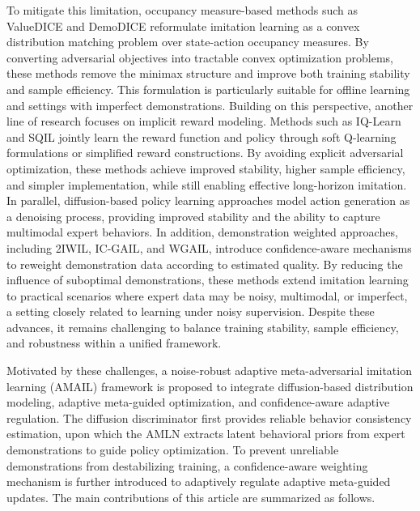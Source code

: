 \documentclass[journal]{IEEEtran}
\begin{document}
To mitigate this limitation, occupancy measure-based methods such as ValueDICE\cite{kostrikov2019imitation} and DemoDICE\cite{kim2021demodice} reformulate imitation learning as a convex distribution matching problem over state-action occupancy measures. By converting adversarial objectives into tractable convex optimization problems, these methods remove the minimax structure and improve both training stability and sample efficiency. This formulation is particularly suitable for offline learning and settings with imperfect demonstrations. Building on this perspective, another line of research focuses on implicit reward modeling. Methods such as IQ-Learn\cite{garg2021iq} and SQIL\cite{reddy2019sqil} jointly learn the reward function and policy through soft Q-learning formulations or simplified reward constructions. By avoiding explicit adversarial optimization, these methods achieve improved stability, higher sample efficiency, and simpler implementation, while still enabling effective long-horizon imitation. In parallel, diffusion-based policy learning approaches model action generation as a denoising process, providing improved stability and the ability to capture multimodal expert behaviors\cite{chi2025diffusion,pearce2023imitating,11168119,11165204}.
In addition, demonstration weighted approaches, including 2IWIL\cite{wu2019imitation}, IC-GAIL\cite{wu2019imitation}, and WGAIL\cite{wang2021learning}, introduce confidence-aware mechanisms to reweight demonstration data according to estimated quality. By reducing the influence of suboptimal demonstrations, these methods extend imitation learning to practical scenarios where expert data may be noisy, multimodal, or imperfect, a setting closely related to learning under noisy supervision\cite{song2022learning}. Despite these advances, it remains challenging to balance training stability, sample efficiency, and robustness within a unified framework.

Motivated by these challenges, a noise-robust adaptive meta-adversarial imitation learning (AMAIL) framework is proposed to integrate diffusion-based distribution modeling, adaptive meta-guided optimization, and confidence-aware adaptive regulation. The diffusion discriminator first provides reliable behavior consistency estimation, upon which the AMLN extracts latent behavioral priors from expert demonstrations to guide policy optimization. To prevent unreliable demonstrations from destabilizing training, a confidence-aware weighting mechanism is further introduced to adaptively regulate adaptive meta-guided updates. The main contributions of this article are summarized as follows.
\end{document}
